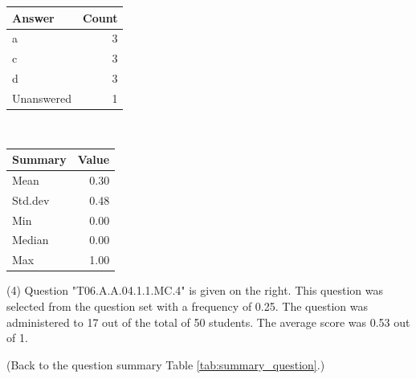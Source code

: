 \documentclass[12pt,english,nohyper]{tufte-handout}\usepackage[]{graphicx}\usepackage[]{color}
\begin{document}
\begin{center}%
\begin{tabular}{lr}
  \hline
Answer & Count \\ 
  \hline
a &   3 \\ 
  c &   3 \\ 
  d &   3 \\ 
  Unanswered &   1 \\ 
   \hline
\end{tabular}
~~~~~~~~%
\begin{tabular}{lr}
  \hline
Summary & Value \\ 
  \hline
Mean & 0.30 \\ 
  Std.dev & 0.48 \\ 
  Min & 0.00 \\ 
  Median & 0.00 \\ 
  Max & 1.00 \\ 
   \hline
\end{tabular}
\end{center}\newpage{} (4) Question "T06.A.A.04.1.1.MC.4" is given on the right. This question was selected from the question set with a frequency of 0.25. The question was administered to 17 out of the total of 50 students. The average score was 0.53 out of 1.

 (Back to the question summary Table \ref{tab:summary_question}.)
\end{document}
